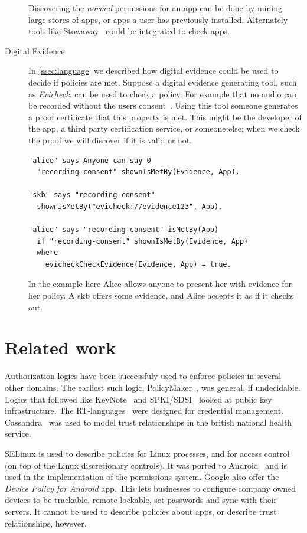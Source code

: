 \documentclass[]{llncs}
\begin{document}
\begin{description}
    Discovering the \emph{normal} permissions for an app can be done by mining large stores of apps, or apps a user has previously installed.
    Alternately tools like Stowaway~\cite{Felt:2011kj} could be integrated to check apps.

  \item[Digital Evidence]
    In \autoref{ssec:language} we described how digital evidence could be used to decide if policies are met.
    Suppose a digital evidence generating tool, such as \emph{Evicheck}, can be used to check a policy.
    For example that no audio can be recorded without the users consent~\cite{Seghir:2014uq}.
    Using this tool someone generates a proof certificate that this property is met.
    This might be the developer of the app, a third party certification service, or someone else;
      when we check the proof we will discover if it is valid or not.
    \begin{lstlisting}
"alice" says Anyone can-say 0
  "recording-consent" shownIsMetBy(Evidence, App).

"skb" says "recording-consent"
  shownIsMetBy("evicheck://evidence123", App).

"alice" says "recording-consent" isMetBy(App)
  if "recording-consent" shownIsMetBy(Evidence, App)
  where
    evicheckCheckEvidence(Evidence, App) = true.
    \end{lstlisting}
    In the example here Alice allows anyone to present her with evidence for her policy.
    A \ac{skb} offers some evidence, and Alice accepts it as if it checks out.
\end{description}

\section{Related work}

Authorization logics have been successfuly used to enforce policies in several other domains.
The earliest such logic, PolicyMaker~\cite{Blaze:dj}, was general, if undecidable.
Logics that followed like KeyNote~\cite{Blaze:1999fa} and SPKI/SDSI~\cite{Ellison:1999ui} looked at public key infrastructure.
The RT-languages~\cite{Li:2002if,Li:2003ix,Li:2003to} were designed for credential management.
Cassandra~\cite{Becker:2004fi} was used to model trust relationships in the british national health service.

SELinux is used to describe policies for Linux processes, and for access control (on top of the Linux discretionary controls).
It was ported to Android~\cite{Smalley:2013vl} and is used in the implementation of the permissions system.
Google also offer the \emph{Device Policy for Android} app.
This lets businesses to configure company owned devices to be trackable, remote lockable, set passwords and sync with their servers.
It cannot be used to describe policies about apps, or describe trust relationships, however.
\end{document}
